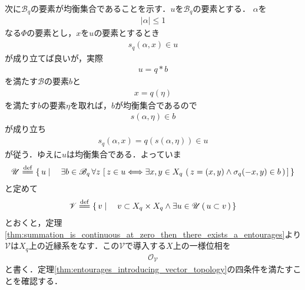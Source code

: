 \begin{sketch}
\begin{description}
				次に$\mathscr{B}_q$の要素が均衡集合であることを示す．$u$を$\mathscr{B}_q$の要素とする．
				$\alpha$を
				\begin{align}
					|\alpha| \leq 1
				\end{align}
				なる$\Phi$の要素とし，$x$を$u$の要素とするとき
				\begin{align}
					s_q(\alpha,x) \in u
				\end{align}
				が成り立てば良いが，実際
				\begin{align}
					u = q \ast b
				\end{align}
				を満たす$\mathscr{B}$の要素$b$と
				\begin{align}
					x = q(\eta)
				\end{align}
				を満たす$b$の要素$\eta$を取れば，$b$が均衡集合であるので
				\begin{align}
					s(\alpha,\eta) \in b
				\end{align}
				が成り立ち
				\begin{align}
					s_q(\alpha,x) = q\left(s(\alpha,\eta)\right) \in u
				\end{align}
				が従う．ゆえに$u$は均衡集合である．よっていま
				\begin{align}
					\mathscr{U} \defeq \Set{u}{\exists b \in \mathscr{B}_q\, 
					\forall z\, \left[\, z \in u \Longleftrightarrow 
					\exists x,y \in X_q\, \left(\, z=(x,y) \wedge \sigma_q(-x,y) \in b\, \right)\, \right]}
				\end{align}
				と定めて
				\begin{align}
					\mathscr{V} \defeq \Set{v}{v \subset X_q \times X_q \wedge \exists u \in \mathscr{U}\,
					(\, u \subset v\, )}
				\end{align}
				とおくと，定理\ref{thm:summation_is_continuous_at_zero_then_there_exists_a_entourages}より
				$\mathscr{V}$は$X_q$上の近縁系をなす．この$\mathscr{V}$で導入する$X$上の一様位相を
				\begin{align}
					\mathscr{O}_{\mathscr{V}}
				\end{align}
				と書く．定理\ref{thm:entourages_introducing_vector_topology}の四条件を満たすことを確認する．
				

\end{description}
\end{sketch}
